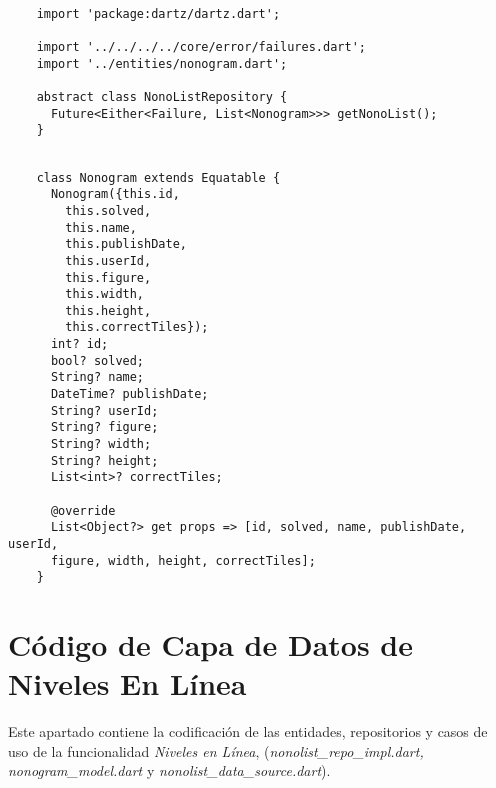     \begin{lstlisting}
    
    import 'package:dartz/dartz.dart';

    import '../../../../core/error/failures.dart';
    import '../entities/nonogram.dart';
    
    abstract class NonoListRepository {
      Future<Either<Failure, List<Nonogram>>> getNonoList();
    }    
    \end{lstlisting}

    \pagebreak

    \begin{lstlisting}

    class Nonogram extends Equatable {
      Nonogram({this.id,
        this.solved,
        this.name,
        this.publishDate,
        this.userId,
        this.figure, 
        this.width, 
        this.height, 
        this.correctTiles});
      int? id;
      bool? solved;
      String? name;
      DateTime? publishDate;
      String? userId;
      String? figure;
      String? width;
      String? height;
      List<int>? correctTiles;

      @override
      List<Object?> get props => [id, solved, name, publishDate, userId,
      figure, width, height, correctTiles];
    }
    \end{lstlisting}

    \section{Código de Capa de Datos de Niveles En Línea}

    \label{cap:anexo1-4}
    
    Este apartado contiene la codificación de las entidades, repositorios y casos de uso de la 
    funcionalidad \textit{Niveles en Línea}, (\textit{nonolist\_repo\_impl.dart, nonogram\_model.dart}
    \linebreak y \textit{nonolist\_data\_source.dart}).
    
